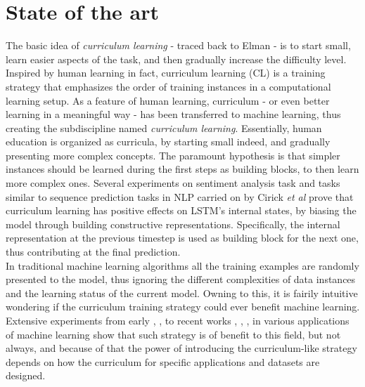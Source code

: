 \section{State of the art}
The basic idea of \textit{curriculum learning} - traced back to Elman - is to start small, learn easier aspects
of the task, and then gradually increase the difficulty level.
Inspired by human learning in fact, curriculum learning (CL) is a training strategy that emphasizes
the order of training instances in a computational learning setup.
As a feature of human learning, curriculum - or even better learning in a meaningful way -
has been transferred to machine learning, thus creating the subdiscipline named
\textit{curriculum learning}.
Essentially, human education is organized as curricula, by starting small indeed, and gradually presenting more complex
concepts. The paramount hypothesis is that simpler instances should be learned
during the first steps as building blocks, to then learn more complex ones. Several experiments on sentiment 
analysis task and tasks similar to sequence prediction tasks in NLP carried on by Cirick \textit{et al} \cite{Cirik2016VisualizingAU} prove that
curriculum learning has positive effects on LSTM's internal states, by biasing the model through building constructive representations. 
Specifically, the internal representation at the previous timestep is used as building block for the next one, thus
contributing at the final prediction.\\
In traditional machine learning algorithms all the training examples are randomly presented to the model,
thus ignoring the different complexities of data instances and the learning status of the current model. 
Owning to this, it is fairily intuitive wondering if the curriculum training strategy could ever benefit machine learning.
Extensive experiments from early \cite{bengio2009curriculum}, \cite{kumar2010self}, \cite{zaremba2014learning} to recent works \cite{fan2018learning}, \cite{graves2017automated}, \cite{hacohen2019power}, \cite{platanios2019competence} in various applications of machine learning show that such strategy is of benefit to this field, but not always, and 
because of that the power of introducing the curriculum-like strategy depends on how the curriculum for specific applications and datasets are designed.

